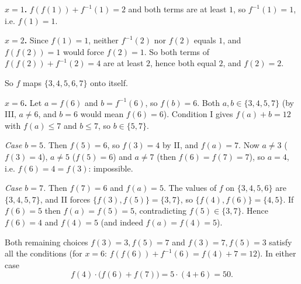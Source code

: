 \textbf{$x=1$.} $f(f(1))+f^{-1}(1)=2$ and both terms are at least $1$, so $f^{-1}(1)=1$, i.e. $f(1)=1$.

\textbf{$x=2$.} Since $f(1)=1$, neither $f^{-1}(2)$ nor $f(2)$ equals $1$, and $f(f(2))=1$ would force $f(2)=1$. So both terms of $f(f(2))+f^{-1}(2)=4$ are at least $2$, hence both equal $2$, and $f(2)=2$.

So $f$ maps $\{3,4,5,6,7\}$ onto itself.

\textbf{$x=6$.} Let $a=f(6)$ and $b=f^{-1}(6)$, so $f(b)=6$. Both $a,b\in\{3,4,5,7\}$ (by III, $a\ne6$, and $b=6$ would mean $f(6)=6$). Condition I gives $f(a)+b=12$ with $f(a)\le7$ and $b\le7$, so $b\in\{5,7\}$.

\emph{Case $b=5$.} Then $f(5)=6$, so $f(3)=4$ by II, and $f(a)=7$. Now $a\ne3$ ($f(3)=4$), $a\ne5$ ($f(5)=6$) and $a\ne7$ (then $f(6)=f(7)=7$), so $a=4$, i.e. $f(6)=4=f(3)$: impossible.

\emph{Case $b=7$.} Then $f(7)=6$ and $f(a)=5$. The values of $f$ on $\{3,4,5,6\}$ are $\{3,4,5,7\}$, and II forces $\{f(3),f(5)\}=\{3,7\}$, so $\{f(4),f(6)\}=\{4,5\}$. If $f(6)=5$ then $f(a)=f(5)=5$, contradicting $f(5)\in\{3,7\}$. Hence $f(6)=4$ and $f(4)=5$ (and indeed $f(a)=f(4)=5$).

Both remaining choices $f(3)=3,f(5)=7$ and $f(3)=7,f(5)=3$ satisfy all the conditions (for $x=6$: $f(f(6))+f^{-1}(6)=f(4)+7=12$). In either case
\[f(4)\cdot\bigl(f(6)+f(7)\bigr)=5\cdot(4+6)=\boxed{50}.\]
